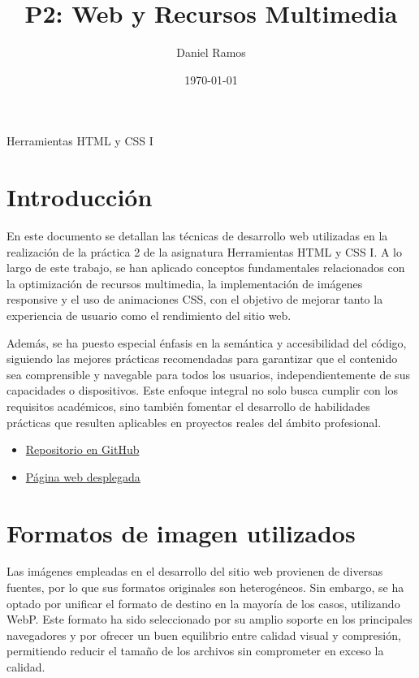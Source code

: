 \documentclass{article}
\title{P2: Web y Recursos Multimedia}
\author{Daniel Ramos}
\date{\today}
\begin{document}
\maketitle

\begin{center}
    \large Herramientas HTML y CSS I
\end{center}

\newpage

\tableofcontents

\newpage

\section*{Introducción}

En este documento se detallan las técnicas de desarrollo web utilizadas en la realización de la práctica 2 de la asignatura Herramientas HTML y CSS I. A lo largo de este trabajo, se han aplicado conceptos fundamentales relacionados con la optimización de recursos multimedia, la implementación de imágenes responsive y el uso de animaciones CSS, con el objetivo de mejorar tanto la experiencia de usuario como el rendimiento del sitio web.

Además, se ha puesto especial énfasis en la semántica y accesibilidad del código, siguiendo las mejores prácticas recomendadas para garantizar que el contenido sea comprensible y navegable para todos los usuarios, independientemente de sus capacidades o dispositivos. Este enfoque integral no solo busca cumplir con los requisitos académicos, sino también fomentar el desarrollo de habilidades prácticas que resulten aplicables en proyectos reales del ámbito profesional.

\begin{itemize}
    \item \href{https://github.com/DanielRamosAcosta/hhyc-dramosac}{Repositorio en GitHub}
    \item \href{https://www.danielramos.me/hhyc-dramosac}{Página web desplegada}
\end{itemize}

\newpage

\section{Formatos de imagen utilizados}\label{sec:formatos-de-imagen-utilizados}

Las imágenes empleadas en el desarrollo del sitio web provienen de diversas fuentes, por lo que sus formatos originales son heterogéneos. Sin embargo, se ha optado por unificar el formato de destino en la mayoría de los casos, utilizando WebP. Este formato ha sido seleccionado por su amplio soporte en los principales navegadores y por ofrecer un buen equilibrio entre calidad visual y compresión, permitiendo reducir el tamaño de los archivos sin comprometer en exceso la calidad.
\end{document}
